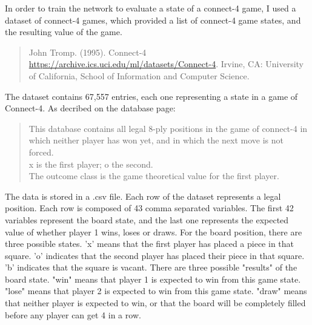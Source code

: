 \documentclass[10pt]{article}
\begin{document}
In order to train the network to evaluate a state of a connect-4 game, I used a dataset of connect-4 games, which provided a list of connect-4 game states, and the resulting value of the game.
\begin{quote}
    John Tromp. (1995). Connect-4 \url{https://archive.ics.uci.edu/ml/datasets/Connect-4}. Irvine, CA: University of California, School of Information and Computer Science.
\end{quote}
The dataset contains 67,557 entries, each one representing a state in a game of Connect-4. As decribed on the database page:
\begin{quote}
    This database contains all legal 8-ply positions in the game of connect-4 in which neither player has won yet, and in which the next move is not forced.\\
x is the first player; o the second.\\
The outcome class is the game theoretical value for the first player.
\end{quote}
The data is stored in a .csv file. Each row of the dataset represents a legal position. Each row is composed of 43 comma separated variables. The first 42 variables represent the board state, and the last one represents the expected value of whether player 1 wins, loses or draws.\newline
For the board position, there are three possible states. 'x' means that the first player has placed a piece in that square. 'o' indicates that the second player has placed their piece in that square. 'b' indicates that the square is vacant.\newline
There are three possible "results" of the board state. "win" means that player 1 is expected to win from this game state. "lose" means that player 2 is expected to win from this game state. "draw" means that neither player is expected to win, or that the board will be completely filled before any player can get 4 in a row.
\end{document}
